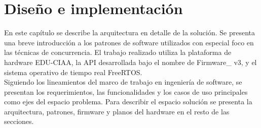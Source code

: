 \chapter{Diseño e implementación} %

En este capítulo se describe la arquitectura en detalle de la solución. Se presenta una breve introducción a los patrones de software utilizados con especial foco en las técnicas de concurrencia. El trabajo realizado utiliza la plataforma de hardware EDU-CIAA, la API desarrollada bajo el nombre de Firmware\_ v3, y el sistema operativo de tiempo real FreeRTOS.\\

Siguiendo los lineamientos del marco de trabajo en ingeniería de software, se presentan los requerimientos, las funcionalidades y los casos de uso principales como ejes del espacio problema. Para describir el espacio solución se presenta la arquitectura, patrones, firmware y planos del hardware en el resto de las secciones.\\


\label{Chapter3} %


